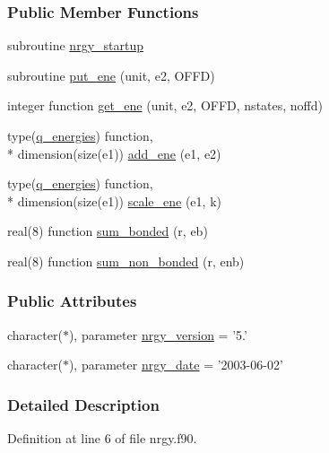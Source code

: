 \subsubsection*{Public Member Functions}
\begin{DoxyCompactItemize}
\item 
subroutine \hyperlink{classnrgy_aa808380012e8ac6202104d60d3a39a3b}{nrgy\-\_\-startup}
\item 
subroutine \hyperlink{classnrgy_aa54dc2246bee3b415ecde9a87918a2a4}{put\-\_\-ene} (unit, e2, O\-F\-F\-D)
\item 
integer function \hyperlink{classnrgy_a772c1b1cceca9cef5fa858e3b9ab2ae2}{get\-\_\-ene} (unit, e2, O\-F\-F\-D, nstates, noffd)
\item 
type(\hyperlink{structnrgy_1_1q__energies}{q\-\_\-energies}) function, \\*
dimension(size(e1)) \hyperlink{classnrgy_a41366a67510d1c42a5d1223931b155c1}{add\-\_\-ene} (e1, e2)
\item 
type(\hyperlink{structnrgy_1_1q__energies}{q\-\_\-energies}) function, \\*
dimension(size(e1)) \hyperlink{classnrgy_ab705568706b4796c8895469846dabe6e}{scale\-\_\-ene} (e1, k)
\item 
real(8) function \hyperlink{classnrgy_a916b95a2fbc30194474a98bb801b8d31}{sum\-\_\-bonded} (r, eb)
\item 
real(8) function \hyperlink{classnrgy_a4a803a3214ff059ae88a7b7feb10ef97}{sum\-\_\-non\-\_\-bonded} (r, enb)
\end{DoxyCompactItemize}
\subsubsection*{Public Attributes}
\begin{DoxyCompactItemize}
\item 
character($\ast$), parameter \hyperlink{classnrgy_a77e39c028132a1d35beb6d56c30d5824}{nrgy\-\_\-version} = '5.'
\item 
character($\ast$), parameter \hyperlink{classnrgy_a00fde95330491e2533e3a8a27bb60736}{nrgy\-\_\-date} = '2003-\/06-\/02'
\end{DoxyCompactItemize}


\subsubsection{Detailed Description}


Definition at line 6 of file nrgy.\-f90.




